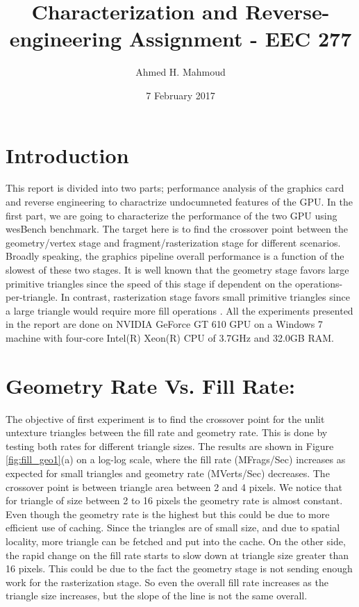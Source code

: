 \documentclass[12pt] {article}
\begin{document}
\title{Characterization and Reverse-engineering Assignment - EEC 277}
\author{Ahmed H. Mahmoud}
\date{7 February 2017} 

\maketitle
\section{Introduction}
This report is divided into two parts; performance analysis of the graphics card and reverse engineering to charactrize undocumneted features of the GPU. In the first part, we are going to characterize the performance of the two GPU using {\selectfont wesBench} benchmark. The target here is to find the crossover point between the geometry/vertex stage and fragment/rasterization stage for different scenarios. Broadly speaking, the graphics pipeline overall performance is a function of the slowest of these two stages. It is well known that the geometry stage favors large primitive triangles since the speed of this stage if dependent on the operations-per-triangle. In contrast, rasterization stage favors small primitive triangles since a large triangle would require more fill operations \cite{Bethel_2010}. All the experiments presented in the report are done on NVIDIA GeForce GT 610 GPU on a Windows 7 machine with four-core Intel(R) Xeon(R) CPU of 3.7GHz and 32.0GB RAM.

\section{Geometry Rate Vs. Fill Rate:}
The objective of first experiment is to find the crossover point for the unlit untexture triangles between the fill rate and geometry rate. This is done by testing both rates for different triangle sizes. The results are shown in Figure \ref{fig:fill_geo1}(a) on a log-log scale, where the fill rate (MFrags/Sec) increases as expected for small triangles and geometry rate (MVerts/Sec) decreases. The crossover point is between triangle area between 2 and 4 pixels. We notice that for triangle of size between 2 to 16 pixels the geometry rate is almost constant.  Even though the geometry rate is the highest but this could be due to more efficient use of caching. Since the triangles are of small size, and due to spatial locality, more triangle can be fetched and put into the cache. On the other side, the rapid change on the fill rate starts to slow down at triangle size greater than 16 pixels. This could be due to the fact the geometry stage is not sending enough work for the rasterization stage. So even the overall fill rate increases as the triangle size increases, but the slope of the line is not the same overall.
\end{document}
